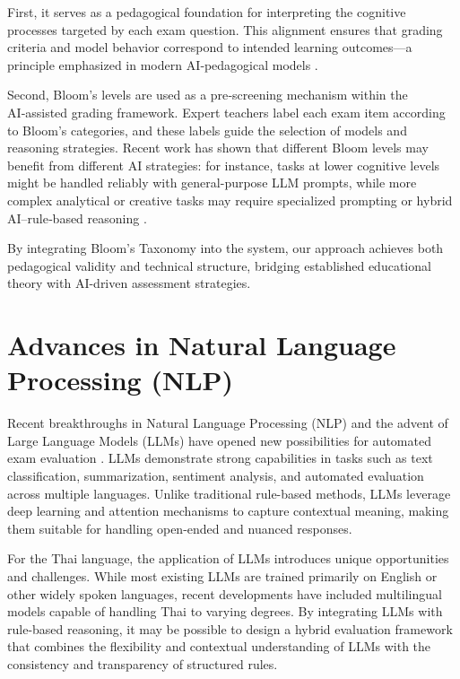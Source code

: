 First, it serves as a pedagogical foundation for interpreting 
the cognitive processes targeted by each exam question. This 
alignment ensures that grading criteria and model behavior 
correspond to intended learning outcomes—a principle 
emphasized in modern AI‑pedagogical models 
\citep{hmoud2024aied, lee2024flipped}.

Second, Bloom’s levels are used as a pre‑screening mechanism 
within the AI‑assisted grading framework. Expert teachers 
label each exam item according to Bloom’s categories, and 
these labels guide the selection of models and reasoning 
strategies. Recent work has shown that different Bloom levels 
may benefit from different AI strategies: for instance, tasks 
at lower cognitive levels might be handled reliably with 
general-purpose LLM prompts, while more complex analytical or 
creative tasks may require specialized prompting or hybrid 
AI–rule‑based reasoning 
\citep{scaria2024automated, luo2025enhanced}.

By integrating Bloom’s Taxonomy into the system, our approach 
achieves both pedagogical validity and technical structure, 
bridging established educational theory with AI-driven 
assessment strategies.

\section{Advances in Natural Language Processing (NLP)}

Recent breakthroughs in Natural Language Processing (NLP) and the advent 
of Large Language Models (LLMs) have opened new possibilities for automated 
exam evaluation \citep{Agarwal2021}. LLMs demonstrate strong capabilities in tasks such as 
text classification, summarization, sentiment analysis, and automated 
evaluation across multiple languages. Unlike traditional rule-based methods, 
LLMs leverage deep learning and attention mechanisms to capture contextual 
meaning, making them suitable for handling open-ended and nuanced responses.

For the Thai language, the application of LLMs introduces unique 
opportunities and challenges. While most existing LLMs are trained 
primarily on English or other widely spoken languages, recent developments 
have included multilingual models capable of handling Thai to varying 
degrees. By integrating LLMs with rule-based reasoning, it may be possible 
to design a hybrid evaluation framework that combines the flexibility and 
contextual understanding of LLMs with the consistency and transparency of 
structured rules.

